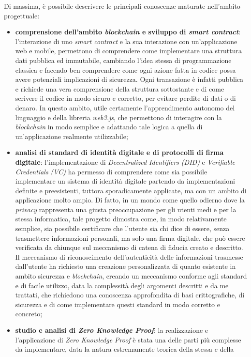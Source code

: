 Di massima, è possibile descrivere le principali conoscenze maturate nell'ambito progettuale:
\begin{itemize}
    \item \textbf{comprensione dell'ambito \textit{blockchain} e sviluppo di \textit{smart contract}}: l'interazione di uno \textit{smart contract} e la sua interazione con un'applicazione web e mobile,
    permettono di comprendere come implementare una struttura dati pubblica ed immutabile, cambiando l'idea stessa di programmazione classica e facendo ben comprendere
    come ogni azione fatta in codice possa avere potenziali implicazioni di sicurezza. Ogni transazione è infatti pubblica e richiede una vera comprensione della struttura sottostante 
    e di come scrivere il codice in modo sicuro e corretto, per evitare perdite di dati o di denaro. In questo ambito, utile certamente l'apprendimento autonomo del linguaggio  e della libreria \textit{web3.js},
    che permettono di interagire con la \textit{blockchain} in modo semplice e adattando tale logica a quella di un'applicazione realmente utilizzabile;
    \item \textbf{analisi di standard di identità digitale e di protocolli di firma digitale}: l'implementazione di \textit{Decentralized Identifiers (DID)} e \textit{Verifiable Credentials (VC)} ha permesso di comprendere come sia possibile implementare un sistema di identità digitale
    partendo da implementazioni definite e preesistenti, tuttora sporadicamente applicate, ma con un ambito di applicazione molto ampio. Di fatto, in un mondo come quello odierno dove la \textit{privacy} rappresenta una giusta preoccupazione per gli utenti medi e per la stessa informatica,
    tale progetto dimostra come, in modo relativamente semplice, sia possibile certificare che l'utente sia chi dice di essere, senza trasmettere informazioni personali, ma solo una firma digitale, che può essere verificata da chiunque sul meccanismo di catena di fiducia
    creato e descritto. Il meccanismo di riconoscimento dell'autenticità delle informazioni trasmesse dall'utente ha richiesto una creazione personalizzata di quanto esistente in ambito sicurezza e \textit{blockchain}, creando un meccanismo conforme agli standard 
    e di facile utilizzo, data la complessità degli argomenti descritti e da me trattati, che richiedono una conoscenza approfondita di basi crittografiche, di sicurezza e di come implementare questi standard in modo corretto e concreto;
    \item \textbf{studio e analisi di \textit{Zero Knowledge Proof}}: la realizzazione e l'applicazione di \textit{Zero Knowledge Proof} è stata una delle parti più complesse da implementare, data la natura estremamente teorica della stessa e della 

\end{itemize}
